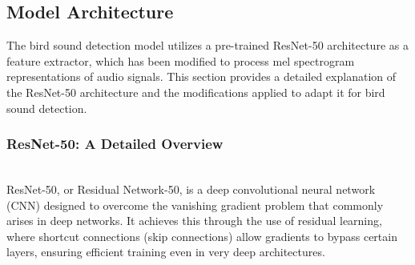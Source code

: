       \subsection{Model Architecture}

      The bird sound detection model utilizes a pre-trained ResNet-50 architecture as a feature extractor, which has been modified to process mel spectrogram representations of audio signals. This section provides a detailed explanation of the ResNet-50 architecture and the modifications applied to adapt it for bird sound detection.

      \subsubsection{ResNet-50: A Detailed Overview}\\
      ResNet-50, or Residual Network-50, is a deep convolutional neural network (CNN) designed to overcome the vanishing gradient problem that commonly arises in deep networks. It achieves this through the use of residual learning, where shortcut connections (skip connections) allow gradients to bypass certain layers, ensuring efficient training even in very deep architectures.

